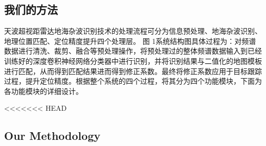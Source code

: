\subsection{我们的方法}

天波超视距雷达地海杂波识别技术的处理流程可分为信息预处理、地海杂波识别、地理位置匹配、定位精度提升四个处理层。 图 1系统结构图具体过程为：对频谱数据进行清洗、裁剪、融合等预处理操作，将预处理过的整体频谱数据输入到已经训练好的深度卷积神经网络分类器中进行识别，并将识别结果与二值化的地图模板进行匹配，从而得到匹配结果进而得到修正系数。最终将修正系数应用于目标跟踪过程，提升定位精度。根据整个系统的四个过程，将其分为四个功能模块，下面为各功能模块的详细设计。

<<<<<<< HEAD
\subsection{Our Methodology}

